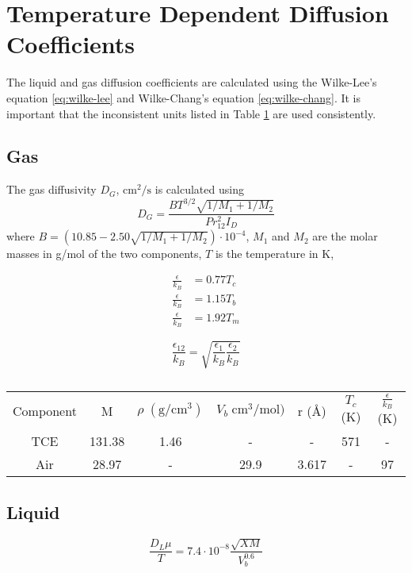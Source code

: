 \documentclass{article}
\begin{document}
\section{Temperature Dependent Diffusion Coefficients}

The liquid and gas diffusion coefficients are calculated using the Wilke-Lee's equation \eqref{eq:wilke-lee} and Wilke-Chang's equation \eqref{eq:wilke-chang}.
It is important that the inconsistent units listed in Table \ref{tbl:dg_inputs} are used consistently.
\subsection{Gas}

The gas diffusivity $D_G$, $\mathrm{cm^2/s}$ is calculated using
\begin{equation}\label{eq:wilke-lee}
  D_G =  \frac{BT^{3/2}\sqrt{1/M_1+1/M_2}}{P r_{12}^2 I_D}
\end{equation}
where $B = (10.85-2.50\sqrt{1/M_1+1/M_2})\cdot 10^{-4}$, $M_1$ and $M_2$ are the molar masses in g/mol of the two components, $T$ is the temperature in K,

\begin{align}
  \frac{\epsilon}{k_B} &= 0.77 T_c \\
  \frac{\epsilon}{k_B} &= 1.15 T_b \\
  \frac{\epsilon}{k_B} &= 1.92 T_m
\end{align}


\begin{equation}
  \frac{\epsilon_{12}}{k_B} = \sqrt{\frac{\epsilon_1}{k_B}\frac{\epsilon_2}{k_B}}
\end{equation}


\begin{table}
  \centering
  \begin{tabular}{c c c c c c c}
    \toprule
    Component & M & $\rho \; \mathrm{(g/cm^3)}$ & $V_b \; \mathrm{cm^3/mol)}$ & r (Å) & $T_c$ (K) & $\frac{\epsilon}{k_B}$ (K) \\
    TCE & 131.38 & 1.46 & - & - & 571 & - \\
    Air & 28.97 & - & 29.9 & 3.617 & - & 97 \\
    \bottomrule
  \end{tabular}
  \caption{}
  \label{tbl:dg_inputs}
\end{table}

\subsection{Liquid}

\begin{equation}\label{eq:wilke-chang}
  \frac{D_L \mu}{T} = 7.4\cdot10^{-8} \frac{\sqrt{XM}}{V_b^{0.6}}
\end{equation}
\end{document}
